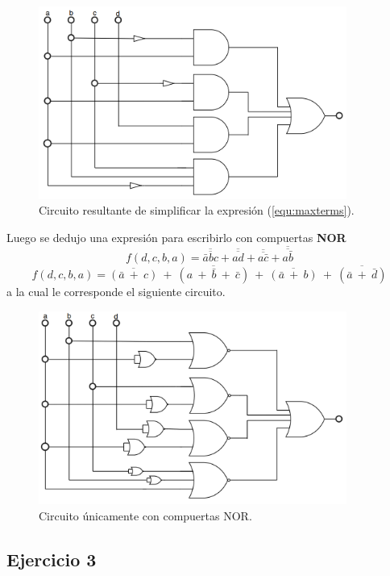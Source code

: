 \documentclass[a4paper]{article}
\begin{document}
\begin{figure}[H]
	\centering
	\includegraphics[width=0.9\textwidth]{Circuito2.PNG}
\caption{Circuito resultante de simplificar la expresión (\ref{equ:maxterms}).}
	\label{fig:circ2}
\end{figure}
Luego se dedujo una expresión para escribirlo con compuertas \textbf{NOR}
\[
	f \left( d,c,b,a \right) = \overline{\overline{\bar{a} b c}} + \overline{\overline{a d}} + \overline{\overline{a \bar{c}}} + \overline{\overline{a \bar{b}}}
\]
\[
	f \left( d,c,b,a \right) = \overline{ \left( \bar{a} \ + \ c \right) } \ + \ \overline{ \left( a \ + \ \bar{b} \ + \ \bar{c} \right) } \ + \ \overline{ \left( \bar{a} \ + \ b \right) } \ + \ \overline{ \left( \bar{a} \ + \ \bar{d}\right) }
\]
a la cual le corresponde el siguiente circuito.

\begin{figure}[H]
	\centering
	\includegraphics[width=0.9\textwidth]{Circuito5.png}
\caption{Circuito únicamente con compuertas NOR.}
	\label{fig:circ5}
\end{figure}
\subsection*{Ejercicio 3}
\end{document}
